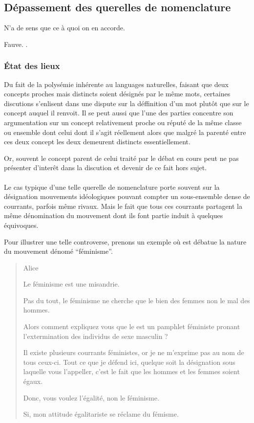 \subsection{Dépassement des querelles de nomenclature}
\epigraph{N’a de sens que ce à quoi on en accorde.}{Fauve. .}
\subsubsection{État des lieux}
Du fait de la polysémie inhérente au languages naturelles, faisant que deux concepts proches mais distincts soient désignés par le même mots, certaines discutions s’enlisent dans une dispute sur la déffinition d’un mot plutôt que sur le concept auquel il renvoit. Il se peut aussi que l’une des parties concentre son argumentation sur un concept relativement proche ou réputé de la même classe ou ensemble dont celui dont il s’agit réellement alors que malgré la parenté entre ces deux concept les deux demeurent distincts essentiellement.

Or, souvent le concept parent de celui traité par le débat en cours peut ne pas présenter d’interêt dans la discution et devenir de ce fait hors sujet.

\paragraph{}
Le cas typique d’une telle querelle de nomenclature porte souvent sur la désignation mouvements idéologiques pouvant compter un sous-ensemble dense de courrants, parfois même rivaux. Mais le fait que tous ces courrants partagent la même dénomination du mouvement dont ils font partie induit à quelques équivoques.

Pour illustrer une telle controverse, prenons un exemple où est débatue la nature du mouvement dénomé \enquote{féminisme}.



\begin{quote}
  \begin{drama}{0cm}{0cm}{Alice}

    \Aspeaks Le féminisme est une misandrie.

    \Bspeaks Pas du tout, le féminisme ne cherche que le bien des femmes non le mal des hommes.

    \Aspeaks Alors comment expliquez vous que le  est un pamphlet féministe pronant l’extermination des individus de sexe masculin ?

    \Bspeaks Il existe plusieurs courrants féministes, or je ne m’exprime pas au nom de tous ceux-ci. Tout ce que je défend ici, quelque soit la désignation sous laquelle vous l’appeller, c’est le fait que les hommes et les femmes soient égaux.

    \Aspeaks Donc, vous voulez l’égalité, non le féminisme.

    \Bspeaks Si, mon attitude égalitariste se réclame du fémisme.

  \end{drama}
\end{quote}

